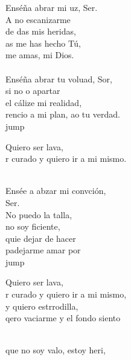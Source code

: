 \begin{cancion}[Resucitados][]%
	Enséña abrar mi uz, Ser. \\
	A no escanizarme \\
	de das mis heridas, \\
	as me has hecho Tú, \\
	 me amas, mi Dios.  \\
	\jump\\
	Enséña abrar tu voluad, Sor,  \\
	si no o apartar \\
	el cálize mi realidad, \\
	rencio a mi plan, ao tu verdad. \\jump\\
	\begin{chorus}%
	Quiero  ser lava, \\
	r curado y quiero ir a mi mismo. \\
	\end{chorus}%
	\jump\\
	Ensée a abzar mi convción, \\
	Ser. \\
	No puedo la talla, \\
	no soy ficiente, \\
	quie dejar de hacer \\
	padejarme amar por  \\jump\\
	\begin{chorus}%
	Quiero  ser lava, \\
	r curado y quiero ir a mi mismo, \\
	y quiero estrrodilla,  \\
	qero vaciarme y el fondo siento\\
	\end{chorus}%
	\jump\\
	que no soy valo, estoy heri, \\

\end{cancion}
